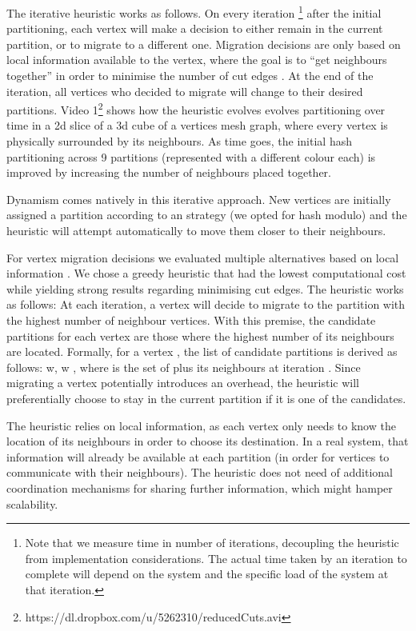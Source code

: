 \documentclass{sig-alternate-10pt}
\begin{document}
The iterative heuristic works as follows.  On every iteration \footnote{Note that we measure time in number of iterations, decoupling the heuristic from implementation considerations. The actual time taken by an iteration to complete will depend on the system and the specific load of the system at that iteration.} after the initial partitioning, each vertex will make a decision to either remain in the current partition, or to migrate to a different one. Migration decisions are only based on local information available to the vertex, where the goal is to ``get neighbours together'' in order to minimise the number of cut edges . At the end of the iteration, all vertices who decided to migrate will change to their desired partitions. Video 1\footnote{https://dl.dropbox.com/u/5262310/reducedCuts.avi} shows how the heuristic evolves evolves partitioning over time in a 2d slice of a 3d cube of a  vertices mesh graph, where every vertex is physically surrounded by its neighbours. As time goes, the initial hash partitioning across 9 partitions (represented with a different colour each) is improved by increasing the number of neighbours placed together.  


Dynamism comes natively in this iterative approach. New vertices are initially assigned a partition according to an strategy (we opted for hash modulo) and the heuristic will attempt automatically to move them closer to their neighbours. 

For vertex migration decisions we evaluated multiple alternatives based on local information \cite{Stanton2012,Prabha12}. We chose a greedy heuristic that had the lowest computational cost while yielding strong results regarding minimising cut edges. The heuristic works as follows: At each iteration, a vertex will decide to migrate to the partition with the highest number of neighbour vertices. With this premise, the candidate partitions for each vertex are those where the highest number of its neighbours are located. Formally, for a vertex , the list of candidate partitions is derived as follows:  w, w , where  is the set of  plus its neighbours at iteration . Since migrating a vertex potentially introduces an overhead, the heuristic will preferentially choose to stay in the current partition if it is one of the candidates.

The heuristic relies on local information, as each vertex  only needs to know the location of its neighbours in order to choose its destination. In a real system, that information will already be available at each partition (in order for vertices to communicate with their neighbours). The heuristic does not need of additional coordination mechanisms for sharing further information, which might hamper scalability.
\end{document}
